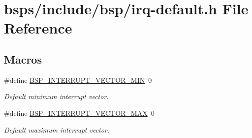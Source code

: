 \hypertarget{irq-default_8h}{}\section{bsps/include/bsp/irq-\/default.h File Reference}
\label{irq-default_8h}
\subsection*{Macros}
\begin{DoxyCompactItemize}
\item 
\#define \mbox{\hyperlink{group__RTEMSBSPsShared_ga64cbb02dfea4d6923abccaa0087d2a0d}{B\+S\+P\+\_\+\+I\+N\+T\+E\+R\+R\+U\+P\+T\+\_\+\+V\+E\+C\+T\+O\+R\+\_\+\+M\+IN}}~0
\begin{DoxyCompactList}\small\item\em Default minimum interrupt vector. \end{DoxyCompactList}\item 
\#define \mbox{\hyperlink{group__RTEMSBSPsShared_gae4a2cdda5816a4c83c2fac0a49880c6e}{B\+S\+P\+\_\+\+I\+N\+T\+E\+R\+R\+U\+P\+T\+\_\+\+V\+E\+C\+T\+O\+R\+\_\+\+M\+AX}}~0
\begin{DoxyCompactList}\small\item\em Default maximum interrupt vector. \end{DoxyCompactList}\end{DoxyCompactItemize}
